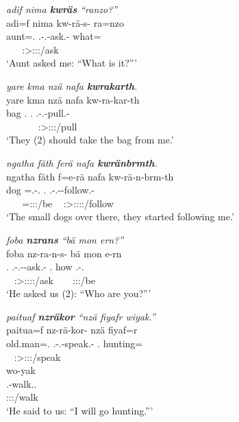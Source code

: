 \begin{exe}
	\ex \emph{adif nima \textbf{kwräs} ``ranzo?''}\\
	\glll adi=f nima kw-rä-s-\Zero{} ra=nzo\\
	aunt=\Erg.{\Sg} {\Quot} \Fsg.\Bet-\Irr.\Ndu-ask.\Rs-\Stsg{} what=\Only\\
	~ ~ {\footnotesize \Stsg:\Sbj>\Fsg:\Obj:\Irr:\Pfv/ask} ~\\
	\trans `Aunt asked me: ``What is it?''' 
	\label{ex243}
\end{exe}
\begin{exe}
	\ex \emph{yare kma nzä nafa \textbf{kwrakarth}.}\\
	\glll yare kma nzä nafa kw-ra-kar-th\\
	bag {\Pot} \Fsg.{\Abs} \Tnsg.{\Erg} \Fsg.\Bet-\Irr.\Du-pull.\Rs-\Stnsg\\
	~ ~ ~ ~ {\footnotesize \Stdu:\Sbj>\Fsg:\Obj:\Irr:\Pfv/pull}\\
	\trans `They (2) should take the bag from me.' 
	\label{ex245}
\end{exe}
\begin{exe}
	\ex \emph{ngatha fäth ferä nafa \textbf{kwränbrmth}.}\\
	\glll ngatha fäth f=e-rä nafa kw-rä-n-brm-th\\
	dog \Dim{} \Dist=\Stnsg.\Alph-\Cop.{\Ndu} \Tnsg.{\Erg} \Fsg{}.\Bet{}-\Irr.\Ndu-\Venit-follow.\Rs-\Stnsg{}\\
	~ ~ {\footnotesize \Dist=\Stpl:\Sbj:\Nonpast:\Ipfv/be} ~ {\footnotesize \Stpl:\Sbj>\Fsg:\Obj:\Irr:\Pfv:\Venit/follow}\\
	\trans `The small dogs over there, they started following me.' 
	\label{ex246}
\end{exe}
\begin{exe}
	\ex \emph{foba \textbf{nzrans} ``bä mon ern?''}\\
	\glll foba nz-ra-n-s-\Zero{} bä mon e-rn\\
	\Dist.{\Abl} \Fnsg.\Bet-\Irr.\Du-\Venit-ask.\Rs-\Stsg{} \Second.{\Abs} how \Stnsg.\Alph-\Cop.\Du\\
	~ {\footnotesize \Stsg:\Sbj>\Fdu:\Obj:\Irr:\Pfv:\Venit/ask} ~ ~ {\footnotesize \Stdu:\Sbj:\Nonpast:\Ipfv/be}\\
	\trans `He asked us (2): ``Who are you?''' 
	\label{ex248}
\end{exe}
\begin{exe}
	\ex \emph{paituaf \textbf{nzräkor} ``nzä fiyafr wiyak.''}\\
	\glll paitua=f nz-rä-kor-\Zero{} nzä fiyaf=r\\
	old.man=\Erg.{\Sg} \Fnsg.\Bet-\Irr.\Ndu-speak.\Rs-\Stsg{} \Fsg.{\Abs} hunting={\Purp}\\
	~ {\footnotesize \Stsg:\Sbj>\Fpl:\Obj:\Irr:\Pfv/speak} ~ ~\\
	\sn
	\glll wo-yak\\
	\Fsg.\Alph-walk.\Ext.\Ndu\\
	{\footnotesize \Fsg:\Sbj:\Nonpast:\Ipfv/walk}\\
	\trans `He said to us: ``I will go hunting.''' 
	\label{ex249}
\end{exe}
